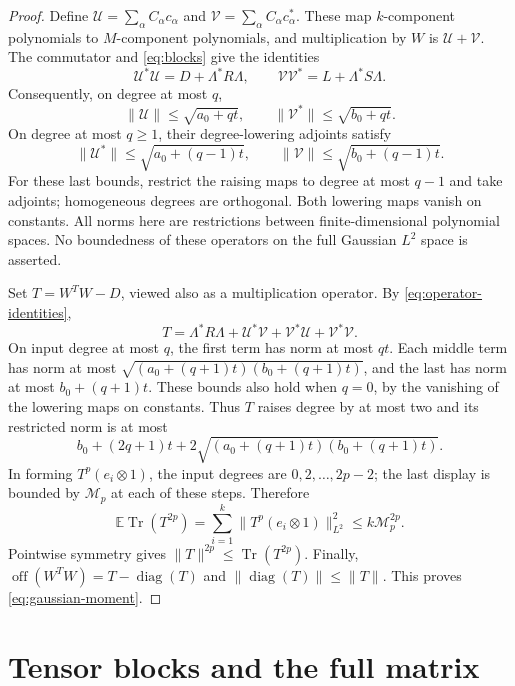 \documentclass[11pt]{article}
\newcommand{\E}{\mathbb E}
\newcommand{\off}{\operatorname{off}}
\newcommand{\diag}{\operatorname{diag}}
\newcommand{\Tr}{\operatorname{Tr}}
\begin{document}
\begin{proof}
Define
\(\mathcal U=\sum_\alpha C_\alpha c_\alpha\) and
\(\mathcal V=\sum_\alpha C_\alpha c_\alpha^*\).
These map \(k\)-component polynomials to \(M\)-component polynomials,
and multiplication by \(W\) is \(\mathcal U+\mathcal V\).
The commutator and \eqref{eq:blocks} give the identities
\begin{equation}\label{eq:operator-identities}
 \mathcal U^*\mathcal U=D+\Lambda^*R\Lambda,\qquad
 \mathcal V\mathcal V^*=L+\Lambda^*S\Lambda.
\end{equation}
Consequently, on degree at most \(q\),
\[
 \|\mathcal U\|\le\sqrt{a_0+qt},\qquad
 \|\mathcal V^*\|\le\sqrt{b_0+qt}.
\]
On degree at most \(q\ge1\), their degree-lowering adjoints satisfy
\[
 \|\mathcal U^*\|\le\sqrt{a_0+(q-1)t},\qquad
 \|\mathcal V\|\le\sqrt{b_0+(q-1)t}.
\]
For these last bounds, restrict the raising maps to degree at most
\(q-1\) and take adjoints; homogeneous degrees are orthogonal.
Both lowering maps vanish on constants.
All norms here are restrictions between finite-dimensional
polynomial spaces. No boundedness of these operators on the full
Gaussian \(L^2\) space is asserted.

Set \(T=W^TW-D\), viewed also as a multiplication operator.
By \eqref{eq:operator-identities},
\[
 T=\Lambda^*R\Lambda+
       \mathcal U^*\mathcal V+
       \mathcal V^*\mathcal U+
       \mathcal V^*\mathcal V.
\]
On input degree at most \(q\), the first term has norm at most
\(qt\). Each middle term has norm at most
\(\sqrt{(a_0+(q+1)t)(b_0+(q+1)t)}\), and the last has norm at
most \(b_0+(q+1)t\). These bounds also hold when \(q=0\), by the
vanishing of the lowering maps on constants.
Thus \(T\) raises degree by at most two and its restricted norm is
at most
\[
 b_0+(2q+1)t+
 2\sqrt{(a_0+(q+1)t)(b_0+(q+1)t)}.
\]
In forming \(T^p(e_i\otimes1)\), the input degrees are
\(0,2,\ldots,2p-2\); the last display is bounded by \(\mathcal M_p\)
at each of these steps. Therefore
\[
 \E\Tr(T^{2p})
 =\sum_{i=1}^k\|T^p(e_i\otimes1)\|_{L^2}^2
 \le k\mathcal M_p^{2p}.
\]
Pointwise symmetry gives \(\|T\|^{2p}\le\Tr(T^{2p})\).
Finally,
\(\off(W^TW)=T-\diag(T)\) and
\(\|\diag(T)\|\le\|T\|\). This proves
\eqref{eq:gaussian-moment}.
\end{proof}

\section{Tensor blocks and the full matrix}\label{sec:tensors}
\end{document}
